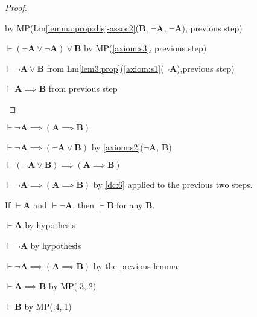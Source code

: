 \documentclass{amsart}%
\newcommand\metavariable[1]{\boldsymbol{#1}}
\begin{document}
\begin{proof}
\begin{enumerate}
\begin{pf}
  by MP(Lm\ref{lemma:prop:disj-assoc2}($\metavariable{B}$, $\neg\metavariable{A}$, $\neg\metavariable{A}$), previous step)
\item $\vdash(\neg\metavariable{A}\lor\neg\metavariable{A})\lor\metavariable{B}$
  by MP(\ref{axiom:s3}, previous step)
\item $\vdash\neg\metavariable{A}\lor\metavariable{B}$ from Lm\ref{lem3:prop}(\ref{axiom:s1}($\neg\metavariable{A}$),previous step)
\item $\vdash\metavariable{A}\implies\metavariable{B}$ from previous step
  \end{pf}
\end{enumerate}
\end{proof}

\begin{lemma}\label{lemma:prop:explode-helper}
$\vdash\neg\metavariable{A}\implies(\metavariable{A}\implies\metavariable{B})$
\end{lemma}

\begin{pf}
\item $\vdash\neg\metavariable{A}\implies(\neg\metavariable{A}\lor\metavariable{B})$
  by \ref{axiom:s2}($\neg\metavariable{A}$, $\metavariable{B}$)
\item $\vdash(\neg\metavariable{A}\lor\metavariable{B})\implies(\metavariable{A}\implies\metavariable{B})$
\item $\vdash\neg\metavariable{A}\implies(\metavariable{A}\implies\metavariable{B})$
  by \ref{dc:6} applied to the previous two steps.
\end{pf}

\begin{lemma}\label{lemma:prop:explosion}
If $\vdash\metavariable{A}$ and $\vdash\neg\metavariable{A}$, then
$\vdash\metavariable{B}$ for any $\metavariable{B}$.
\end{lemma}

\begin{pf}
\item $\vdash\metavariable{A}$ by hypothesis
\item $\vdash\neg\metavariable{A}$ by hypothesis
\item $\vdash\neg\metavariable{A}\implies(\metavariable{A}\implies\metavariable{B})$
  by the previous lemma
\item $\vdash\metavariable{A}\implies\metavariable{B}$ by MP(.3,.2)
\item $\vdash\metavariable{B}$ by MP(.4,.1)
\end{pf}
  
\end{document}
